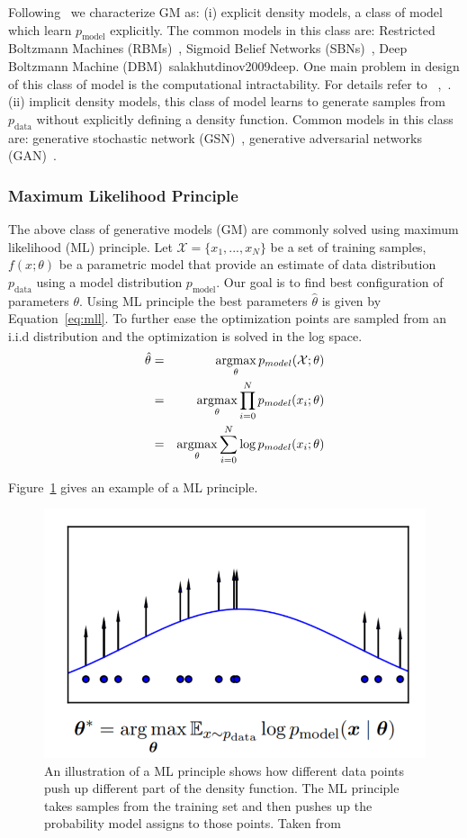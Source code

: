 Following~\cite{goodfellow2016nips} we characterize GM as: (i) explicit density models, a class of model which learn $p_\text{model}$ explicitly. The common models in this class are: Restricted Boltzmann Machines (RBMs)~\cite{salakhutdinov2007restricted}, Sigmoid Belief Networks (SBNs)~\cite{hinton2009deep}, Deep Boltzmann Machine (DBM)~\cite{}salakhutdinov2009deep. One main problem in design of this class of model is the computational intractability. For details refer to ~\cite{salakhutdinov2015learning},~\cite{goodfellow2016nips}.
(ii) implicit density models, this class of model learns to generate samples from $p_\text{data}$ without explicitly defining a density function. Common models in this class are: generative stochastic network (GSN)~\cite{bengio2014deep}, generative adversarial networks (GAN)~\cite{goodfellow2014generative}.

\subsubsection{Maximum Likelihood Principle}
\label{sub:mll}
The above class of generative models (GM) are commonly solved using maximum likelihood (ML) principle.
Let $\mathcal{X}=\{x_1,...,x_N\}$ be a set of training samples, $f(x;\theta)$ be a parametric model that provide an estimate of data distribution $p_\text{data}$ using a model distribution $p_\text{model}$.  Our goal is to find best configuration of parameters $\theta$. Using ML principle the best parameters $\hat{\theta}$ is given by Equation~\ref{eq:mll}. To further ease the optimization points are sampled from an i.i.d distribution and the optimization is solved in the log space.
\begin{eqnarray}
     \label{eq:mll}
    \hat{\theta} & = & \operatorname*{argmax}_{\theta}p_{model}(\mathcal{X};\theta)\\
     &= & \operatorname*{argmax}_{\theta} \prod_{i=0}^N p_{model}(x_i;\theta)\\
     &= & \operatorname*{argmax}_{\theta} \sum_{i=0}^N \log p_{model}(x_i;\theta)
\end{eqnarray}

Figure~\ref{fig:mll} gives an example of a ML principle.
\begin{figure}
    \centering
    \includegraphics[width=0.45\columnwidth]{master_thesis_template/figs/mll.PNG}
    \caption{An illustration of a ML principle shows how different data points push up different part of the density function. The ML principle takes samples from the training set and then pushes up the probability model assigns to those points. Taken from~\cite{goodfellow2016nips}}
    \label{fig:mll}
\end{figure}

